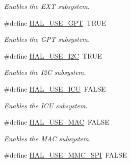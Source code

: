 \begin{DoxyCompactItemize}
\begin{DoxyCompactList}\small\item\em Enables the E\+X\+T subsystem. \end{DoxyCompactList}\item 
\hypertarget{group__HAL__CONF_gab4702b9e1b6fa2869e26c274fccd53f0}{}\#define \hyperlink{group__HAL__CONF_gab4702b9e1b6fa2869e26c274fccd53f0}{H\+A\+L\+\_\+\+U\+S\+E\+\_\+\+G\+P\+T}~T\+R\+U\+E\label{group__HAL__CONF_gab4702b9e1b6fa2869e26c274fccd53f0}

\begin{DoxyCompactList}\small\item\em Enables the G\+P\+T subsystem. \end{DoxyCompactList}\item 
\hypertarget{group__HAL__CONF_gae5eb94efa72e401dc17a356b27f4e7e5}{}\#define \hyperlink{group__HAL__CONF_gae5eb94efa72e401dc17a356b27f4e7e5}{H\+A\+L\+\_\+\+U\+S\+E\+\_\+\+I2\+C}~T\+R\+U\+E\label{group__HAL__CONF_gae5eb94efa72e401dc17a356b27f4e7e5}

\begin{DoxyCompactList}\small\item\em Enables the I2\+C subsystem. \end{DoxyCompactList}\item 
\hypertarget{group__HAL__CONF_gac58fde738d018b1233a5441ae4c6245b}{}\#define \hyperlink{group__HAL__CONF_gac58fde738d018b1233a5441ae4c6245b}{H\+A\+L\+\_\+\+U\+S\+E\+\_\+\+I\+C\+U}~F\+A\+L\+S\+E\label{group__HAL__CONF_gac58fde738d018b1233a5441ae4c6245b}

\begin{DoxyCompactList}\small\item\em Enables the I\+C\+U subsystem. \end{DoxyCompactList}\item 
\hypertarget{group__HAL__CONF_ga0da24d012c72a79db22e5621b391d3da}{}\#define \hyperlink{group__HAL__CONF_ga0da24d012c72a79db22e5621b391d3da}{H\+A\+L\+\_\+\+U\+S\+E\+\_\+\+M\+A\+C}~F\+A\+L\+S\+E\label{group__HAL__CONF_ga0da24d012c72a79db22e5621b391d3da}

\begin{DoxyCompactList}\small\item\em Enables the M\+A\+C subsystem. \end{DoxyCompactList}\item 
\hypertarget{group__HAL__CONF_gafc4461ac2cc33590839ed91f2e940079}{}\#define \hyperlink{group__HAL__CONF_gafc4461ac2cc33590839ed91f2e940079}{H\+A\+L\+\_\+\+U\+S\+E\+\_\+\+M\+M\+C\+\_\+\+S\+P\+I}~F\+A\+L\+S\+E\label{group__HAL__CONF_gafc4461ac2cc33590839ed91f2e940079}


\end{DoxyCompactItemize}
